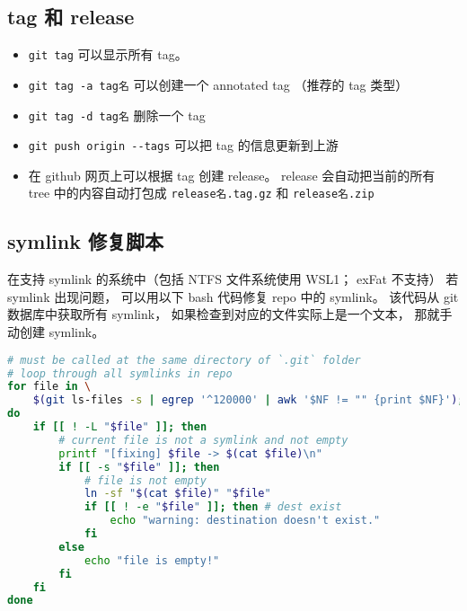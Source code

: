 \subsection{tag 和 release}
\begin{itemize}
\item \verb`git tag` 可以显示所有 tag。
\item \verb`git tag -a tag名` 可以创建一个 annotated tag （推荐的 tag 类型）
\item \verb`git tag -d tag名` 删除一个 tag
\item \verb`git push origin --tags` 可以把 tag 的信息更新到上游
\item 在 github 网页上可以根据 tag 创建 release。 release 会自动把当前的所有 tree 中的内容自动打包成 \verb`release名.tag.gz` 和 \verb`release名.zip`
\end{itemize}

\subsection{symlink 修复脚本}

在支持 symlink 的系统中（包括 NTFS 文件系统使用 WSL1； exFat 不支持） 若 symlink 出现问题， 可以用以下 bash 代码修复 repo 中的 symlink。 该代码从 git 数据库中获取所有 symlink， 如果检查到对应的文件实际上是一个文本， 那就手动创建 symlink。

\begin{lstlisting}[language=bash, caption=fix\_git\_symlink.sh]
# must be called at the same directory of `.git` folder
# loop through all symlinks in repo
for file in \
	$(git ls-files -s | egrep '^120000' | awk '$NF != "" {print $NF}');
do
	if [[ ! -L "$file" ]]; then
		# current file is not a symlink and not empty
		printf "[fixing] $file -> $(cat $file)\n"
		if [[ -s "$file" ]]; then
			# file is not empty
			ln -sf "$(cat $file)" "$file"
			if [[ ! -e "$file" ]]; then # dest exist
				echo "warning: destination doesn't exist."
			fi
		else
			echo "file is empty!"
		fi
	fi
done
\end{lstlisting}

